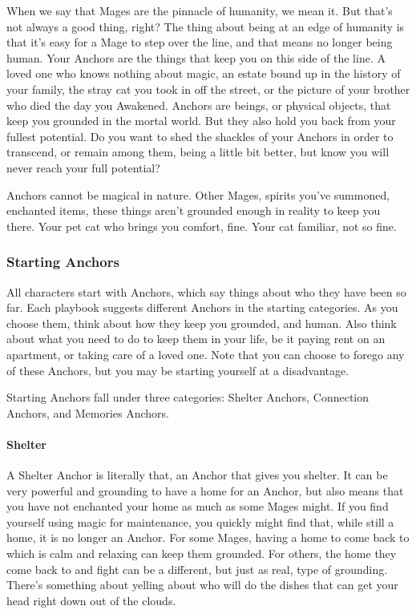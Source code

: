 \documentclass[
]{article}
\begin{document}
When we say that Mages are the pinnacle of humanity, we mean it. But
that's not always a good thing, right? The thing about being at an edge
of humanity is that it's easy for a Mage to step over the line, and that
means no longer being human. Your Anchors are the things that keep you
on this side of the line. A loved one who knows nothing about magic, an
estate bound up in the history of your family, the stray cat you took in
off the street, or the picture of your brother who died the day you
Awakened. Anchors are beings, or physical objects, that keep you
grounded in the mortal world. But they also hold you back from your
fullest potential. Do you want to shed the shackles of your Anchors in
order to transcend, or remain among them, being a little bit better, but
know you will never reach your full potential?

Anchors cannot be magical in nature. Other Mages, spirits you've
summoned, enchanted items, these things aren't grounded enough in
reality to keep you there. Your pet cat who brings you comfort, fine.
Your cat familiar, not so fine.

\hypertarget{starting-anchors}{%
\subsubsection{Starting Anchors}\label{starting-anchors}}

All characters start with Anchors, which say things about who they have
been so far. Each playbook suggests different Anchors in the starting
categories. As you choose them, think about how they keep you grounded,
and human. Also think about what you need to do to keep them in your
life, be it paying rent on an apartment, or taking care of a loved one.
Note that you can choose to forego any of these Anchors, but you may be
starting yourself at a disadvantage.

Starting Anchors fall under three categories: Shelter Anchors,
Connection Anchors, and Memories Anchors.

\hypertarget{shelter}{%
\paragraph{Shelter}\label{shelter}}

A Shelter Anchor is literally that, an Anchor that gives you shelter. It
can be very powerful and grounding to have a home for an Anchor, but
also means that you have not enchanted your home as much as some Mages
might. If you find yourself using magic for maintenance, you quickly
might find that, while still a home, it is no longer an Anchor. For some
Mages, having a home to come back to which is calm and relaxing can keep
them grounded. For others, the home they come back to and fight can be a
different, but just as real, type of grounding. There's something about
yelling about who will do the dishes that can get your head right down
out of the clouds.
\end{document}
